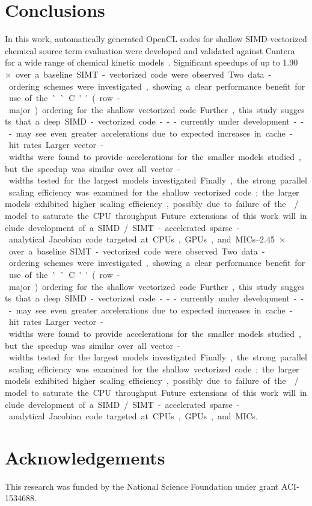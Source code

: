 \documentclass[12pt,number,sort&compress]{elsarticle}
\begin{document}
\section{Conclusions}
In this work, automatically generated OpenCL codes for shallow SIMD-vectorized chemical source term evaluation were developed and validated against Cantera~\cite{Cantera} for a wide range of chemical kinetic models~\cite{Burke:2011fh,smith_gri-mech_30,Wang:2007,Sarathy:2013jr}.
Significant speedups of up to \SIrange{1.90}{2.45}{$\times$} over a baseline SIMT-vectorized code were observed.
Two data-ordering schemes were investigated, showing a clear performance benefit for use of the ``C'' (row-major) ordering for the shallow vectorized code.
Further, this study suggests that a deep SIMD-vectorized code---currently under development---may see even greater accelerations due to expected increases in cache-hit rates.
Larger vector-widths were found to provide accelerations for the smaller models studied, but the speedup was similar over all vector-widths tested for the largest models investigated.
Finally, the strong parallel scaling efficiency was examined for the shallow vectorized code; the larger models exhibited higher scaling efficiency, possibly due to failure of the \slash{} model to saturate the CPU throughput.
Future extensions of this work will include development of a SIMD\slash SIMT-accelerated sparse-analytical Jacobian code targeted at CPUs, GPUs, and MICs.

\section{Acknowledgements}
This research was funded by the National Science Foundation under grant ACI-1534688.


\end{document}
